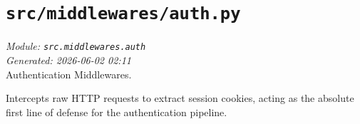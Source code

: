 
\section{\texttt{src/middlewares/auth.py}}
\textit{Module: \texttt{src.middlewares.auth}} \\
\textit{Generated: 2026-06-02 02:11} \\

Authentication Middlewares.

Intercepts raw HTTP requests to extract session cookies, acting as the
absolute first line of defense for the authentication pipeline.
